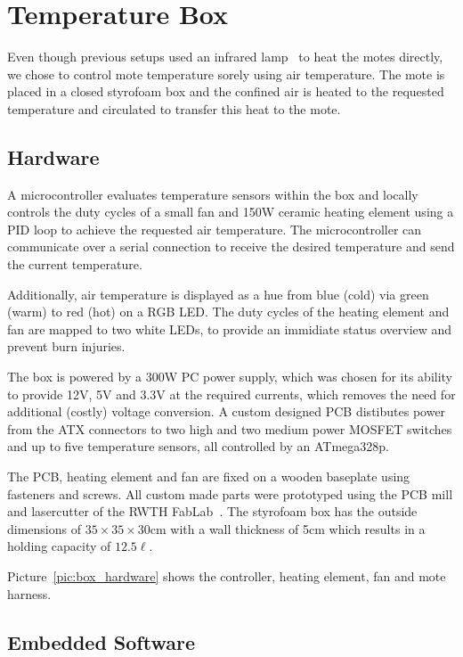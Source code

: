 \section{Temperature Box}
\label{sec:temperature_box}

Even though previous setups used an infrared lamp~\cite{Boano2013, Hermans2013} to heat the motes directly, we chose to control mote temperature sorely using air temperature.
The mote is placed in a closed styrofoam box and the confined air is heated to the requested temperature and circulated to transfer this heat to the mote.

\subsection{Hardware}
A microcontroller evaluates temperature sensors within the box and locally controls the duty cycles of a small fan and 150W ceramic heating element using a PID loop to achieve the requested air temperature.
The microcontroller can communicate over a serial connection to receive the desired temperature and send the current temperature.

Additionally, air temperature is displayed as a hue from blue (cold) via green (warm) to red (hot) on a RGB LED.
The duty cycles of the heating element and fan are mapped to two white LEDs, to provide an immidiate status overview and prevent burn injuries.

The box is powered by a 300W PC power supply, which was chosen for its ability to provide 12V, 5V and 3.3V at the required currents, which removes the need for additional (costly) voltage conversion.
A custom designed PCB distibutes power from the ATX connectors to two high and two medium power MOSFET switches and up to five temperature sensors, all controlled by an ATmega328p.

The PCB, heating element and fan are fixed on a wooden baseplate using fasteners and screws.
All custom made parts were prototyped using the PCB mill and lasercutter of the RWTH FabLab~\cite{fablab}.
The styrofoam box has the outside dimensions of $35 \times 35 \times 30$cm with a wall thickness of 5cm which results in a holding capacity of $12.5\ell$.

Picture~\ref{pic:box_hardware} shows the controller, heating element, fan and mote harness.

\subsection{Embedded Software}

